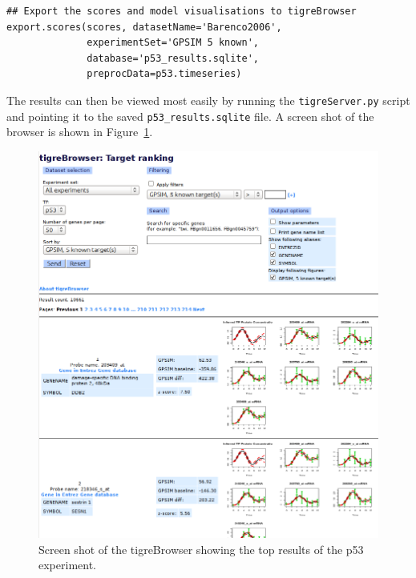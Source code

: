 \documentclass[11pt]{article}
\begin{document}
\begin{lstlisting}[frame=single]
## Export the scores and model visualisations to tigreBrowser
export.scores(scores, datasetName='Barenco2006',
              experimentSet='GPSIM 5 known',
              database='p53_results.sqlite',
              preprocData=p53.timeseries)
\end{lstlisting}

The results can then be viewed most easily by running the
\texttt{tigreServer.py} script and pointing it to the saved
\texttt{p53\_results.sqlite} file.  A screen shot of the
browser is shown in Figure~\ref{fig:browser_screenshot}.

\begin{figure}[htbp]
  \centering
  \includegraphics[width=\textwidth]{browser_screenshot.png}
  \caption{Screen shot of the tigreBrowser showing the top results of
    the p53 experiment.}
  \label{fig:browser_screenshot}
\end{figure}
\end{document}
